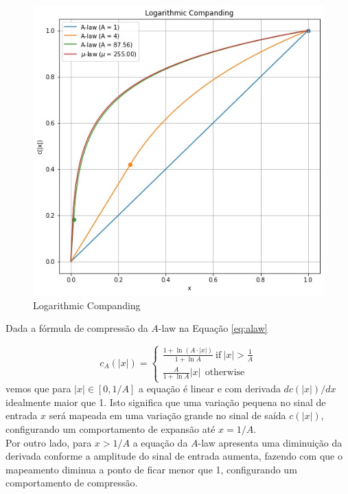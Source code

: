 \documentclass[a4paper]{article}
\begin{document}
\begin{figure}[h]
    \centering
    \includegraphics[width=15cm]{images/logaritmic_companding.jpeg}
    \caption{Logarithmic Companding}
    \label{fig:companding}
\end{figure}

Dada a fórmula de compressão da $A$-law na Equação \ref{eq:alaw}

\begin{equation}
  c_A(|x|) =
    \begin{cases}
      \frac{1+\ln (A\cdot |x|)}{1+\ln A}\ \text{if}\ |x| > \frac{1}{A}\\
      \frac{A}{1+\ln A} |x|\ \ \text{otherwise}
    \end{cases}       
    \label{eq:alaw}
\end{equation} vemos que para $|x| \in [0, 1/A]$ a equação é linear e com derivada $d c(|x|)/ d x$ idealmente maior que 1. Isto significa que uma variação pequena no sinal de entrada $x$ será mapeada em uma variação grande no sinal de saída $c(|x|)$, configurando um comportamento de expansão até $x = 1/A$.\\

Por outro lado, para $x > 1/A$ a equação da $A$-law apresenta uma diminuição da derivada conforme a amplitude do sinal de entrada aumenta, fazendo com que o mapeamento diminua a ponto de ficar menor que 1, configurando um comportamento de compressão. \\
\end{document}
